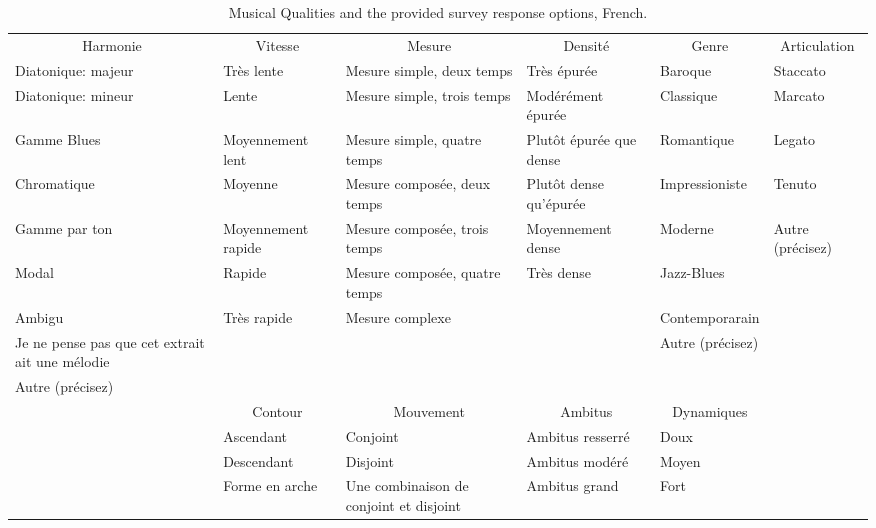 \documentclass[
]{article}
\makeatletter
\newenvironment{lltable}{\begin{landscape}\begin{center}\begin{ThreePartTable}}{\end{ThreePartTable}\end{center}\end{landscape}}
\newcommand\LastLTentrywidth{1em}
\newlength\longtablewidth
\newcommand{\getlongtablewidth}{\begingroup \ifcsname LT@\roman{LT@tables}\endcsname \global\longtablewidth=0pt \renewcommand{\LT@entry}[2]{\global\advance\longtablewidth by ##2\relax\gdef\LastLTentrywidth{##2}}\@nameuse{LT@\roman{LT@tables}} \fi \endgroup}
\makeatother
\begin{document}
\begin{lltable}
\begin{footnotesize}
\begin{longtable}{p{}p{}p{}p{}p{}p{}}\noalign{\getlongtablewidth\global\LTcapwidth=\longtablewidth}
\caption{\label{tab:qualitiestablefr}Musical Qualities and the provided survey response options, French.}\\
\toprule[.8pt]
 \multicolumn{1}{c}{Harmonie} & \multicolumn{1}{c}{Vitesse} & \multicolumn{1}{c}{Mesure} & \multicolumn{1}{c}{Densité} & \multicolumn{1}{c}{Genre} & \multicolumn{1}{c}{Articulation}\\
 \midrule
      Diatonique: majeur & Très lente & Mesure simple, deux temps & Très épurée & Baroque & Staccato \\
      Diatonique: mineur & Lente & Mesure simple, trois temps & Modérément épurée & Classique & Marcato \\
      Gamme Blues & Moyennement lent & Mesure simple, quatre temps & Plutôt épurée que dense & Romantique & Legato\\
      Chromatique & Moyenne & Mesure composée, deux temps & Plutôt dense qu’épurée & Impressioniste & Tenuto\\
      Gamme par ton & Moyennement rapide & Mesure composée, trois temps & Moyennement dense & Moderne & Autre (précisez) \\       
      Modal  & Rapide & Mesure composée, quatre temps & Très dense & Jazz-Blues & \\
      Ambigu  & Très rapide & Mesure complexe & & Contemporarain & \\
      \multirow{2}{0.2\textwidth}{Je ne pense pas que cet extrait ait une mélodie}  & & & & Autre (précisez) & \\
        & & & & & \\
      Autre (précisez)  & & & & & \\
\bottomrule\addlinespace[.5em]
 & \multicolumn{1}{c}{Contour} & \multicolumn{1}{c}{Mouvement} & \multicolumn{1}{c}{Ambitus} & \multicolumn{1}{c}{Dynamiques} & \\
 \cmidrule[.5pt]{2-5}
  & Ascendant & Conjoint & Ambitus resserré & Doux & \\
  & Descendant & Disjoint & Ambitus modéré & Moyen  & \\
  & Forme en arche & \multirow{2}{0.2\textwidth}{Une combinaison de conjoint et disjoint} & Ambitus grand & Fort  & \\

\end{longtable}
\end{footnotesize}
\end{lltable}
\end{document}
